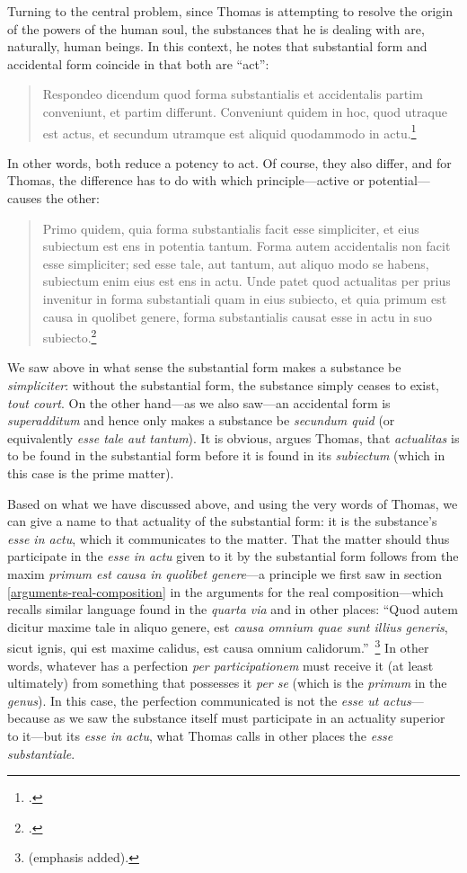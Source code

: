 Turning to the central problem, since Thomas is attempting to resolve the origin of the powers of the human soul, the substances that he is dealing with are, naturally, human beings. In this context, he notes that substantial form and accidental form coincide in that both are ``act'':
%
\begin{quotation}
Respondeo dicendum quod forma substantialis et accidentalis partim conveniunt, et partim differunt. Conveniunt quidem in hoc, quod utraque est actus, et secundum utramque est aliquid quodammodo in actu.\footcite[I, q.~77, a.~6, co.]{st:summa}
\end{quotation}
%
In other words, both reduce a potency to act. Of course, they also differ, and for Thomas, the difference has to do with which principle---active or potential---causes the other:
%
\begin{quotation}
Primo quidem, quia forma substantialis facit esse simpliciter, et eius subiectum est ens in potentia tantum. Forma autem accidentalis non facit esse simpliciter; sed esse tale, aut tantum, aut aliquo modo se habens, subiectum enim eius est ens in actu. Unde patet quod actualitas per prius invenitur in forma substantiali quam in eius subiecto, et quia primum est causa in quolibet genere, forma substantialis causat esse in actu in suo subiecto.\footcite[I, q.~77, a.~6, co.]{st:summa}
\end{quotation}
%
We saw above in what sense the substantial form makes a substance be \emph{simpliciter}: without the substantial form, the substance simply ceases to exist, \emph{tout court}. On the other hand---as we also saw---an accidental form is \emph{superadditum} and hence  only makes a substance be \emph{secundum quid} (or equivalently \emph{esse tale aut tantum}). It is obvious, argues Thomas, that \emph{actualitas} is to be found in the substantial form before it is found in its \emph{subiectum} (which in this case is the prime matter).

Based on what we have discussed above, and using the very words of Thomas, we can give a name to that actuality of the substantial form: it is the substance's \emph{esse in actu}, which it communicates to the matter. That the matter should thus participate in the \emph{esse in actu} given to it by the substantial form follows from the maxim \emph{primum est causa in quolibet genere}---a principle we first saw in section \ref{arguments-real-composition} in the arguments for the real composition---which recalls similar language found in the \emph{quarta via} and in other places: ``Quod autem dicitur maxime tale in aliquo genere, est \emph{causa omnium quae sunt illius generis}, sicut ignis, qui est maxime calidus, est causa omnium calidorum.''\,%
%
\footnote{\Cite[I, q.~2, a.~3]{st:summa} (emphasis added).}
%
In other words, whatever has a perfection \emph{per participationem} must receive it (at least ultimately) from something that possesses it \emph{per se} (which is the \emph{primum} in the \emph{genus}). In this case, the perfection communicated is not the \emph{esse ut actus}---because as we saw the substance itself must participate in an actuality superior to it---but its \emph{esse in actu}, what Thomas calls in other places the \emph{esse substantiale}.

